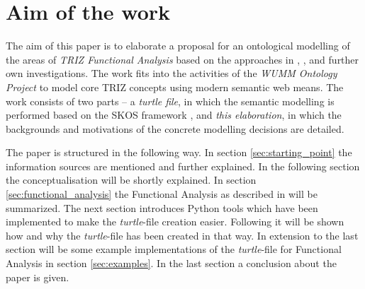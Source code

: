 \section{Aim of the work}

The aim of this paper is to elaborate a proposal for an ontological modelling
of the areas of \emph{TRIZ Functional Analysis} based on the approaches
in \cite{KS}, \cite{WebinarFunctionAnalysis}, \cite{SouchkovGlossary} and further own investigations.
The work fits into the activities of the \emph{WUMM Ontology Project}
\cite{WUMM} to model core TRIZ concepts using modern semantic web means.  The
work consists of two parts -- a \emph{turtle file}, in which the semantic
modelling is performed based on the SKOS framework \cite{SKOS}, and \emph{this
  elaboration}, in which the backgrounds and motivations of the concrete
modelling decisions are detailed.

The paper is structured in the following way. 
In section \ref{sec:starting_point} the information sources are mentioned and further explained.
In the following section the conceptualisation will be shortly explained.
In section \ref{sec:functional_analysis} the Functional Analysis as described in \cite{KS} will be summarized.
The next section introduces Python tools which have been implemented to make the \textit{turtle}-file creation easier.
Following it will be shown how and why the \textit{turtle}-file has been created in that way.
In extension to the last section will be some example implementations of the \textit{turtle}-file for Functional Analysis in section \ref{sec:examples}.
In the last section a conclusion about the paper is given.
